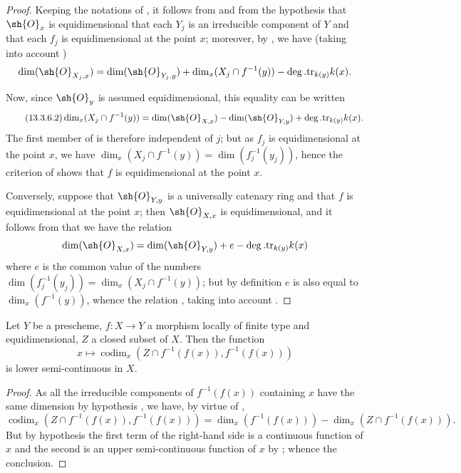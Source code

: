 \begin{proof}
Keeping the notations of , it follows from  and from the hypothesis that $\sh{O}_x$ is equidimensional that each $Y_j$ is an irreducible component of $Y$ and that each $f_j$ is equidimensional at the point $x$; moreover, by , we have (taking into account )
\[
  \dim(\sh{O}_{X_j,x})=\dim(\sh{O}_{Y_j,y})+\dim_x(X_j\cap f^{-1}(y))-\deg.\mathrm{tr}_{k(y)}k(x).
\]


Now, since $\sh{O}_y$ is assumed equidimensional, this equality can be written
\[
\tag{13.3.6.2}
\label{IV.13.3.6.2}
  \dim_x(X_j\cap f^{-1}(y))=\dim(\sh{O}_{X,x})-\dim(\sh{O}_{Y,y})+\deg.\mathrm{tr}_{k(y)}k(x).
\]
The first member of  is therefore independent of $j$; but as $f_j$ is equidimensional at the point $x$, we have $\dim_x(X_j\cap f^{-1}(y))=\dim(f_j^{-1}(y_j))$, hence the criterion of  shows that $f$ is equidimensional at the point $x$.

Conversely, suppose that $\sh{O}_{Y,y}$ is a universally catenary ring and that $f$ is equidimensional at the point $x$; then  $\sh{O}_{X,x}$ is equidimensional, and it follows from  that we have the relation
\[
  \dim(\sh{O}_{X,x})=\dim(\sh{O}_{Y,y})+e-\deg.\mathrm{tr}_{k(y)}k(x)
\]
where $e$ is the common value of the numbers $\dim(f_j^{-1}(y_j))=\dim_x(X_j\cap f^{-1}(y))$; but by definition $e$ is also equal to $\dim_x(f^{-1}(y))$, whence the relation , taking into account .
\end{proof}

\begin{proposition}[13.3.7]
\label{IV.13.3.7}
Let $Y$ be a prescheme, $f:X\to Y$ a morphism locally of finite type and equidimensional, $Z$ a closed subset of $X$.
Then the function
\[
\label{IV.13.3.7.1}
\tag{13.3.7.1}
  x\mapsto\operatorname{codim}_x(Z\cap f^{-1}(f(x)),f^{-1}(f(x)))
\]
is lower semi-continuous in $X$.
\end{proposition}

\begin{proof}
As all the irreducible components of $f^{-1}(f(x))$ containing $x$ have the same dimension by hypothesis , we have, by virtue of ,
\[
  \operatorname{codim}_x(Z\cap f^{-1}(f(x)),f^{-1}(f(x)))=\dim_x(f^{-1}(f(x)))-\dim_x(Z\cap f^{-1}(f(x))).
\]
But by hypothesis the first term of the right-hand side is a continuous function of $x$  and the second is an upper semi-continuous function of $x$ by ; whence the conclusion.
\end{proof}

